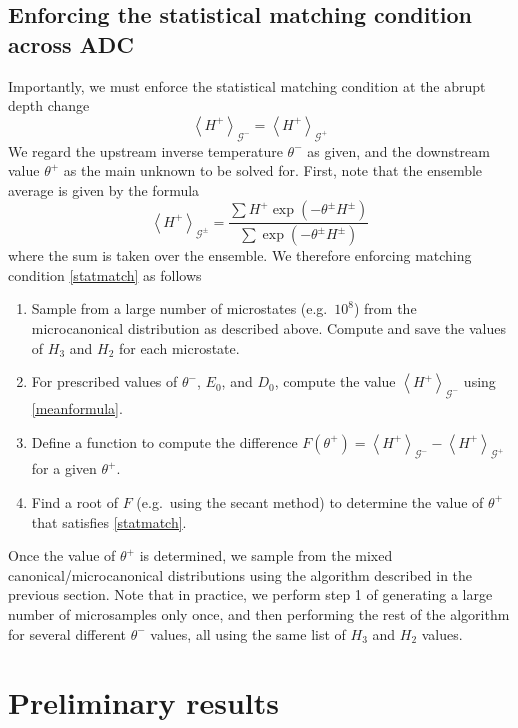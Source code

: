 \documentclass[12pt]{article}
\newcommand{\mean}[1]{\left< #1 \right>}
\newcommand{\Gibbs}{\mathcal{G}}
\begin{document}
\subsection{Enforcing the statistical matching condition across ADC}
\label{sec_match}

Importantly, we must enforce the statistical matching condition at the abrupt depth change
\begin{equation}
\label{statmatch}
\mean{H^+}_{\Gibbs^-} = \mean{H^+}_{\Gibbs^+}
\end{equation}
We regard the upstream inverse temperature $\theta^-$ as given, and the downstream value $\theta^+$ as the main unknown to be solved for.
First, note that the ensemble average is given by the formula
\begin{equation}
\label{meanformula}
\mean{H^+}_{\Gibbs^{\pm}} = \frac{ \sum H^+ \exp(- \theta^{\pm} H^{\pm}) } {\sum \exp(-\theta^{\pm} H^{\pm}) }
\end{equation}
where the sum is taken over the ensemble. We therefore enforcing matching condition \eqref{statmatch} as follows

\begin{enumerate}
\item Sample from a large number of microstates (e.g.~$10^8$) from the microcanonical distribution as described above. Compute and save the values of $H_3$ and $H_2$ for each microstate.
\item For prescribed values of $\theta^-$, $E_0$, and $D_0$, compute the value $\mean{H^+}_{\Gibbs^-}$ using \eqref{meanformula}.
\item Define a function to compute the difference $F(\theta^+) = \mean{H^+}_{\Gibbs^-} - \mean{H^+}_{\Gibbs^+}$ for a given $\theta^+$.
\item Find a root of $F$ (e.g.~using the secant method) to determine the value of $\theta^+$ that satisfies \eqref{statmatch}.
\end{enumerate}
Once the value of $\theta^+$ is determined, we sample from the mixed canonical/microcanonical distributions using the algorithm described in the previous section. Note that in practice, we perform step 1 of generating a large number of microsamples only once, and then performing the rest of the algorithm for several different $\theta^-$ values, all using the same list of $H_3$ and $H_2$ values.


\section{Preliminary results}
\end{document}
